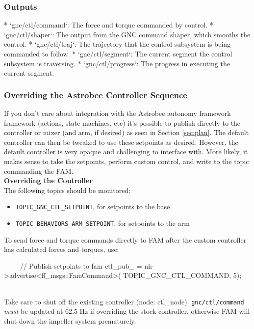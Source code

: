 \documentclass{article}
\begin{document}
\subsubsection{Outputs}
\begin{markdown}
* `gnc/ctl/command`: The force and torque commanded by control.
* `gnc/ctl/shaper`: The output from the GNC command shaper, which smooths the control.
* `gnc/ctl/traj`: The trajectory that the control subsystem is being commanded to follow.
* `gnc/ctl/segment`: The current segment the control subsystem is traversing.
* `gnc/ctl/progress`: The progress in executing the current segment.
\end{markdown}

\subsubsection{Overriding the Astrobee Controller Sequence}

If you don't care about integration with the Astrobee autonomy framework
framework (actions, state machines, etc) it's possible to publish directly to the controller or mixer (and arm, if desired) as seen in Section \ref{sec:plan}. The default controller can then be tweaked to use these setpoints as desired. However, the default controller is very opaque and challenging to interface with. More likely, it makes sense to take the setpoints, perform custom control, and write to the topic commanding the FAM.\\

\noindent\textbf{Overriding the Controller}
\\
\indent The following topics should be monitored:
\\
\begin{itemize}
	\item \texttt{TOPIC\_GNC\_CTL\_SETPOINT}, for setpoints to the base
	\item \texttt{TOPIC\_BEHAVIORS\_ARM\_SETPOINT}, for setpoints to the arm
\end{itemize}

\indent To send force and torque commands directly to FAM after the custom controller has calculated forces and torques, use:
\begin{markdown}
~~~~
//  Publish setpoints to fam
ctl_pub_ = nh->advertise<ff_msgs::FamCommand>(
TOPIC_GNC_CTL_COMMAND, 5);
~~~~
\end{markdown}

Take care to shut off the existing controller (node: ctl\_node). \texttt{gnc/ctl/command} \textit{must} be updated at 62.5 Hz if overriding the stock controller, otherwise FAM will shut down the impeller system prematurely.
\end{document}
